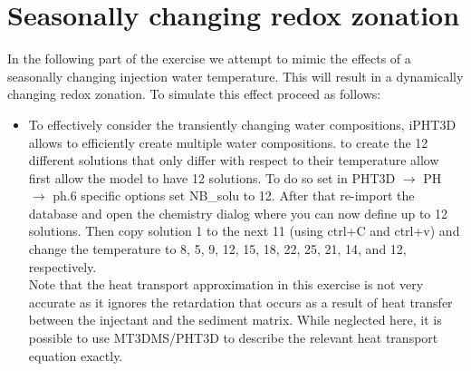 \section[Seasonally changing redox zonation]{Seasonally changing redox zonation}

In the following part of the exercise we attempt to mimic the effects of a seasonally changing
injection water temperature. This will result in a dynamically changing redox zonation.
To simulate this effect proceed as follows:

\begin{itemize}

\item To effectively consider the transiently changing water compositions, iPHT3D allows to 
efficiently create multiple water compositions.
to create the 12 different solutions that only differ with respect to their temperature allow first allow the model to have 12 solutions. 
To do so set in 
{\color{blue}PHT3D} $\rightarrow$ {\color{blue}PH} $\rightarrow$ {\color{blue}ph.6 specific options}
set {\color{red}NB\_solu} to 12. After that re-import the database and open the chemistry dialog
where you can now define up to 12 solutions. Then copy solution 1 to the next 11 
(using ctrl+C and ctrl+v) and change the 
temperature to 8, 5, 9, 12, 15, 18, 22, 25, 21, 14, and 12, respectively. 
\\
Note that the heat transport approximation in this exercise is not very accurate
as it ignores the retardation that occurs as a result of heat transfer between
the injectant and the sediment matrix. 
While neglected here, it is possible to use MT3DMS/PHT3D to describe 
the relevant heat transport equation exactly. 

\end{itemize}



